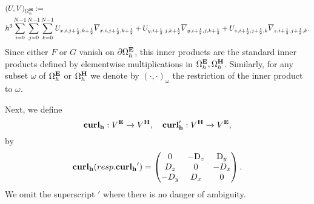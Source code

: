 \documentclass[12pt,reqno]{amsart}
\newcommand{\D}{{\rm D}}
\newcommand{\curl}{{\bf curl}}
\newcommand{\e}{{\bf E}}
\newcommand{\h}{{\bf H}}
\theoremstyle{definition}
\numberwithin{equation}{section}
\def\Gwh{\Omega_h}
\begin{document}
		\begin{align*}
			&
			(U,V)_{\Gwh^\h}:=\\&
			h^3\sum_{i=0}^{N-1}\sum_{j=0}^{N-1}\sum_{k=0}^{N-1}
			U_{x,i,j+\frac{1}{2},k+\frac{1}{2}}\overline{V}_{x,i,j+\frac{1}{2},k+\frac{1}{2}}+
			U_{y,i+\frac{1}{2},j,k+\frac{1}{2}}\overline{V}_{y,i+\frac{1}{2},j,k+\frac{1}{2}}+U_{z,i+\frac{1}{2},j+\frac{1}{2},k}\overline{V}_{z,i+\frac{1}{2},j+\frac{1}{2},k}.
		\end{align*}
		Since either $F$ or $G$ vanish on $\partial \Gwh^\e$, this inner products are the standard inner products defined by elementwise  multiplications in $\Gwh^\e, \Gwh^\h$.
		Similarly, for any subset $\omega$ of $\Gwh^\e$ or $\Gwh^\h$ we denote by $(\cdot,\cdot)_{\omega}$ the restriction of the  inner product to $\omega$.
		
		
		
		Next, we define 
		$$
		\mathbf{\curl_h}:V^{\bf{E}}\to V^{\bf{H}}, \quad 
		\mathbf{\curl_h'}:V^{\bf{H}}\to V^{\bf{E}},
		$$
		by
		$$
		\mathbf{\curl_h}( resp. \mathbf{\curl_h}')=
		\begin{pmatrix}
			0& -\D_z & \D _y\\
			D_z&0&-D_x\\
			-D_y&D_x&0\\
		\end{pmatrix}.
		$$
		We omit the superscript $'$ where there is no danger of ambiguity.
		
\end{document}
